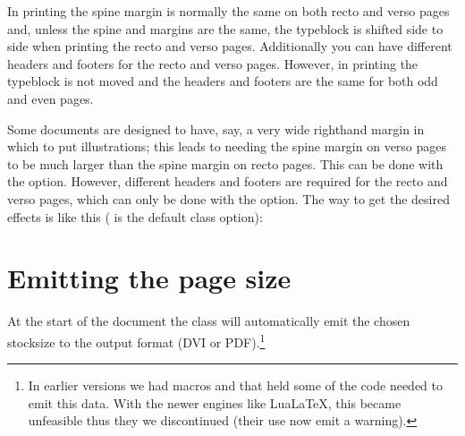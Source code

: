     In  printing the spine margin is normally the same on
both recto and verso pages and, unless the spine and \foredge{} margins are the
same, the typeblock is shifted side to side when printing the recto and 
verso pages. Additionally you can have different headers and footers for the
recto and verso pages. However, in  printing the typeblock 
is not moved and the headers and footers are the same for both odd and 
even pages.

    Some documents are designed to have, say, a very wide righthand margin
in which to put illustrations; this leads to needing the spine margin on
verso pages to be much larger than the spine margin on recto pages. This
can be done with the  option. However, different headers
and footers are required for the recto and verso pages, which can only be
done with the  option. The way to get the desired effects
is like this ( is the default class option):


\section{Emitting the page size}
\label{sec:emitting-page-size}

At the start of the document the class will automatically emit the
chosen stocksize to the output format (DVI or PDF).\footnote{In
  earlier versions we had macros  and
   that held some of the code needed to emit this
  data. With the newer engines like LuaLaTeX, this became unfeasible
  thus they we discontinued (their use now emit a warning).}


